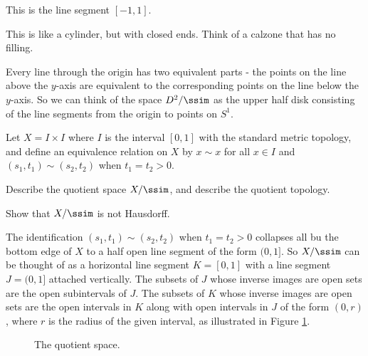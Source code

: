 \ba

\item This is the line segment $[-1,1]$.

\item This is like a cylinder, but with closed ends. Think of a calzone that has no filling.

\item Every line through the origin has two equivalent parts - the points on the line above the $y$-axis are equivalent to the corresponding points on the line below the $y$-axis. So we can think of the space $D^2/\ssim$ as the upper half disk consisting of the line segments from the origin to points on $S^1$. 


\ea


\item Let $X = I \times I$ where $I$ is the interval $[0,1]$ with the standard metric topology, and define an equivalence relation on $X$ by $x \sim x$ for all $x \in I$ and $(s_1, t_1) \sim (s_2,t_2)$ when $t_1 = t_2 > 0$. 
\ba
\item Describe the quotient space $X/\ssim$, and describe the quotient topology.

\item Show that $X/\ssim$ is not Hausdorff.

\ea


\ExerciseSolution

\ba

\item The identification $(s_1, t_1) \sim (s_2,t_2)$ when $t_1 = t_2 > 0$ collapses all bu the bottom edge of $X$ to a half open line segment of the form $(0,1]$. So $X/\ssim$ can be thought of as a horizontal line segment $K = [0,1]$ with a line segment $J = (0,1]$ attached vertically. The subsets of $J$ whose inverse images are open sets are the open subintervals of $J$. The subsets of $K$ whose inverse images are open sets are the open intervals in $K$ along with open intervals in $J$ of the form $(0,r)$, where $r$ is the radius of the given interval, as illustrated in Figure \ref{F:Quotient_Homework_Segments}.  
\begin{figure}[h]
\begin{center}
\caption{The quotient space.} 
\label{F:Quotient_Homework_Segments}
\end{center}
\end{figure}

